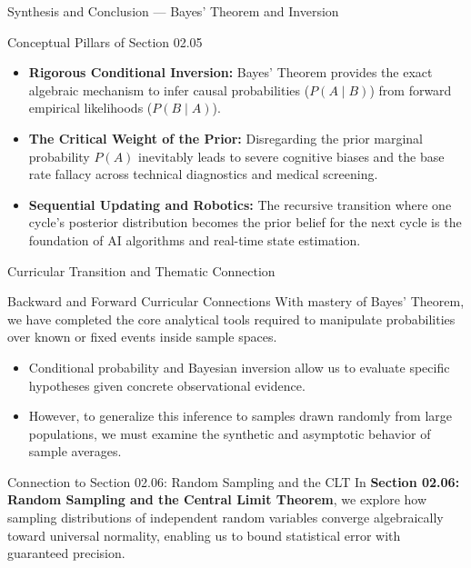 \documentclass[10pt, aspectratio=169]{beamer}
\begin{document}
\begin{frame}{Synthesis and Conclusion --- Bayes' Theorem and Inversion}
  \fontsize{7.5pt}{9pt}\selectfont
  \begin{block}{Conceptual Pillars of Section 02.05}
    \fontsize{7.5pt}{9pt}\selectfont
    \begin{itemize}\itemsep=0.12cm
      \item \textbf{Rigorous Conditional Inversion:} Bayes' Theorem provides the exact algebraic mechanism to infer causal probabilities ($P(A \mid B)$) from forward empirical likelihoods ($P(B \mid A)$).
      \item \textbf{The Critical Weight of the Prior:} Disregarding the prior marginal probability $P(A)$ inevitably leads to severe cognitive biases and the base rate fallacy across technical diagnostics and medical screening.
      \item \textbf{Sequential Updating and Robotics:} The recursive transition where one cycle's posterior distribution becomes the prior belief for the next cycle is the foundation of AI algorithms and real-time state estimation.
    \end{itemize}
  \end{block}
\end{frame}

\begin{frame}{Curricular Transition and Thematic Connection}
  \fontsize{7.5pt}{9pt}\selectfont
  \begin{block}{Backward and Forward Curricular Connections}
    \fontsize{7.5pt}{9pt}\selectfont
    With mastery of Bayes' Theorem, we have completed the core analytical tools required to manipulate probabilities over known or fixed events inside sample spaces.
    \begin{itemize}\itemsep=0.1cm
      \item Conditional probability and Bayesian inversion allow us to evaluate specific hypotheses given concrete observational evidence.
      \item However, to generalize this inference to samples drawn randomly from large populations, we must examine the synthetic and asymptotic behavior of sample averages.
    \end{itemize}
  \end{block}
  \vspace{-0.15cm}
  \pause
  \begin{alertblock}{Connection to Section 02.06: Random Sampling and the CLT}
    \fontsize{7.5pt}{9pt}\selectfont
    In \textbf{Section 02.06: Random Sampling and the Central Limit Theorem}, we explore how sampling distributions of independent random variables converge algebraically toward universal normality, enabling us to bound statistical error with guaranteed precision.
  \end{alertblock}
\end{frame}
\end{document}
